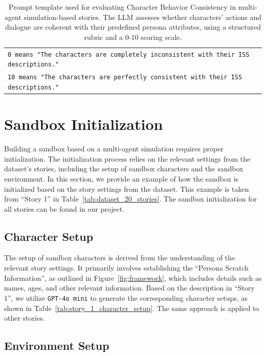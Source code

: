 \documentclass[letterpaper]{article} %
\begin{document}
\begin{table}[]
\begin{tabularx}{\textwidth}{X}
    \texttt{0 means "The characters are completely inconsistent with their ISS descriptions."} \\

    \texttt{10 means "The characters are perfectly consistent with their ISS descriptions."} \\

    \bottomrule
  \end{tabularx}
  \caption{Prompt template used for evaluating Character Behavior Consistency in multi-agent simulation-based stories. The LLM assesses whether characters' actions and dialogue are coherent with their predefined persona attributes, using a structured rubric and a 0-10 scoring scale.}
  \label{tab:auto_eval_prompt_template_char_behav_cons}
\end{table}


\section{Sandbox Initialization}
\label{sec:sandbox_initialization}

Building a sandbox based on a multi-agent simulation requires proper initialization. The initialization process relies on the relevant settings from the dataset's stories, including the setup of sandbox characters and the sandbox environment. In this section, we provide an example of how the sandbox is initialized based on the story settings from the dataset. This example is taken from ``Story 1'' in Table~\ref{tab:dataset_20_stories}. The sandbox initialization for all stories can be found in our project.

\subsection{Character Setup}

The setup of sandbox characters is derived from the understanding of the relevant story settings. It primarily involves establishing the ``Persona Scratch Information'', as outlined in Figure~\ref{fig:framework}, which includes details such as names, ages, and other relevant information. Based on the description in ``Story 1'', we utilize \texttt{GPT-4o mini} to generate the corresponding character setups, as shown in Table~\ref{tab:story_1_character_setup}. The same approach is applied to other stories.

\subsection{Environment Setup}
\end{document}

